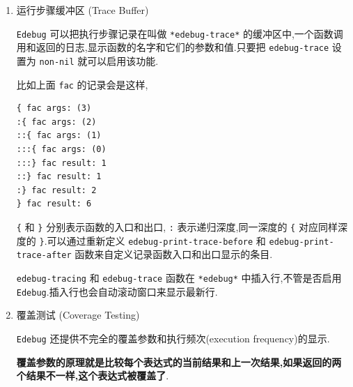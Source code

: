 \documentclass[11pt]{article}
\begin{document}
\begin{enumerate}
如果尝试在 \texttt{Edebug} 中打印一个包含循环列表结构的值,那么可能会发生错误.

克服(cope with)循环结构的一个方法就是把 \texttt{print-length} 或者 \texttt{print-level} 来分断显示. \texttt{Edebug} 已经帮你做好了.

它把这两个变量分别绑定到 \texttt{edebug-print-length} 和 \texttt{edebug-print-level},默认值都是50.

也可以通过设置 \texttt{print-circle} 为 \texttt{non-nil} 来打印那种有着共享元素的循环结构体.

比如

\begin{verbatim}
(setq a '(x y))
(setcar a a)
;; 显示为 #1=(#1# y), #1= 表示用1标记结构,#1#表示引用前一个被标记的结构.这个标记可以用在任何列表或者向量的共享元素上.
\end{verbatim}

相应的 \texttt{Edebug} 有 \texttt{edebug-print-circle},会把这个变量的值绑定给 \texttt{print-circle}.


\item 运行步骤缓冲区 (Trace Buffer)
\label{sec:org25f2ffe}

\texttt{Edebug} 可以把执行步骤记录在叫做 \texttt{*edebug-trace*} 的缓冲区中,一个函数调用和返回的日志,显示函数的名字和它们的参数和值.只要把 \texttt{edebug-trace} 设置为 \texttt{non-nil} 就可以启用该功能.

比如上面 \texttt{fac} 的记录会是这样,

\begin{verbatim}
{ fac args: (3)
:{ fac args: (2)
::{ fac args: (1)
:::{ fac args: (0)
:::} fac result: 1
::} fac result: 1
:} fac result: 2
} fac result: 6
\end{verbatim}

\texttt{\{} 和 \texttt{\}} 分别表示函数的入口和出口, \texttt{:} 表示递归深度,同一深度的 \texttt{\{} 对应同样深度的 \texttt{\}}.可以通过重新定义 \texttt{edebug-print-trace-before} 和 \texttt{edebug-print-trace-after} 函数来自定义记录函数入口和出口显示的条目.

\texttt{edebug-tracing} 和 \texttt{edebug-trace} 函数在 \texttt{*edebug*} 中插入行,不管是否启用 \texttt{Edebug}.插入行也会自动滚动窗口来显示最新行.


\item 覆盖测试 (Coverage Testing)
\label{sec:org2ea4a30}

\texttt{Edebug} 还提供不完全的覆盖参数和执行频次(execution frequency)的显示.

\textbf{覆盖参数的原理就是比较每个表达式的当前结果和上一次结果,如果返回的两个结果不一样,这个表达式被覆盖了}.


\end{enumerate}
\end{document}
